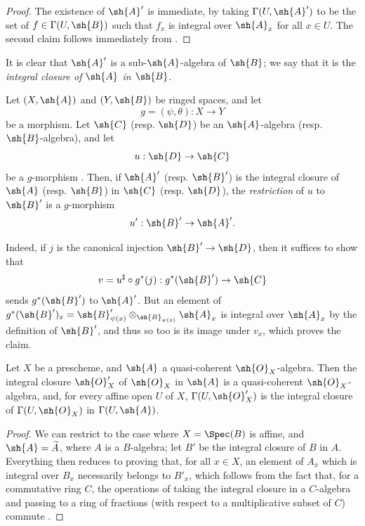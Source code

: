 \begin{proof}
The existence of $\sh{A}'$ is immediate, by taking $\Gamma(U,\sh{A}')$ to be the set of $f\in\Gamma(U,\sh{B})$ such that $f_x$ is integral over $\sh{A}_x$ for all $x\in U$.
The second claim follows immediately from .
\end{proof}

It is clear that $\sh{A}'$ is a sub-$\sh{A}$-algebra of $\sh{B}$;
we say that it is the \emph{integral closure of $\sh{A}$ in $\sh{B}$}.

\begin{env}[6.3.3]
\label{II.6.3.3}
Let $(X,\sh{A})$ and $(Y,\sh{B})$ be ringed spaces, and let
\[
  g = (\psi,\theta):X\to Y
\]
be a morphism.
Let $\sh{C}$ (resp. $\sh{D}$) be an $\sh{A}$-algebra (resp. $\sh{B}$-algebra), and let
\[
  u:\sh{D}\to\sh{C}
\]
be a $g$-morphism .
Then, if $\sh{A}'$ (resp. $\sh{B}'$) is the integral closure of $\sh{A}$ (resp. $\sh{B}$) in $\sh{C}$ (resp. $\sh{D}$), the \emph{restriction} of $u$ to $\sh{B}'$ is a $g$-morphism
\[
  u':\sh{B}'\to\sh{A}'.
\]

Indeed, if $j$ is the canonical injection $\sh{B}'\to\sh{D}$, then it suffices to show that
\[
  v = u^\sharp\circ g^*(j) : g^*(\sh{B}')\to\sh{C}
\]
sends $g^*(\sh{B}')$ to $\sh{A}'$.
But an element of $g^*(\sh{B}')_x=\sh{B}'_{\psi(x)}\otimes_{\sh{B}_{\psi(x)}}\sh{A}_x$ is integral over $\sh{A}_x$ by the definition of $\sh{B}'$, and thus so too is its image under $v_x$, which proves the claim.
\end{env}

\begin{proposition}[6.3.4]
\label{II.6.3.4}
Let $X$ be a prescheme, and $\sh{A}$ a quasi-coherent $\sh{O}_X$-algebra.
Then the integral closure $\sh{O}'_X$ of $\sh{O}_X$ in $\sh{A}$ is a quasi-coherent $\sh{O}_X$-algebra, and, for every affine open $U$ of $X$, $\Gamma(U,\sh{O}'_X)$ is the integral closure of $\Gamma(U,\sh{O}_X)$ in $\Gamma(U,\sh{A})$.
\end{proposition}

\begin{proof}
We can restrict to the case where $X=\Spec(B)$ is affine, and $\sh{A}=\widetilde{A}$, where $A$ is a $B$-algebra;
let $B'$ be the integral closure of $B$ in $A$.
Everything then reduces to proving that, for all $x\in X$, an element of $A_x$ which is integral over $B_x$ necessarily belongs to $B'_x$, which follows from the fact that, for a commutative ring $C$, the operations of taking the integral closure in a $C$-algebra and passing to a ring of fractions (with respect to a multiplicative subset of $C$) commute \cite[t.~I, pp.~261 and 257]{I-13}.
\end{proof}

